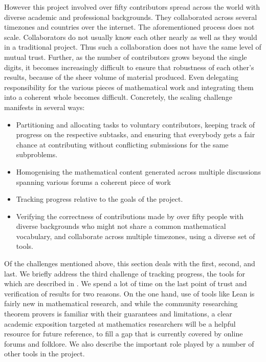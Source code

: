 However this project involved over fifty contributors spread across the world with diverse academic and professional backgrounds. They collaborated across several timezones and countries over the internet. The aforementioned process does not scale. Collaborators do not usually know each other nearly as well as they would in a traditional project. Thus such a collaboration does not have the same level of mutual trust. Further, as the number of contributors grows beyond the single digits, it becomes increasingly difficult to ensure that robustness of each other's results, because of the sheer volume of material produced. Even delegating responsibility for the various pieces of mathematical work and integrating them into a coherent whole becomes difficult. Concretely, the scaling challenge manifests in several ways:
\begin{itemize}
    \item Partitioning and allocating tasks to voluntary contributors, keeping track of progress on the respective subtasks, and ensuring that everybody gets a fair chance at contributing without conflicting submissions for the same subproblems.
    \item Homogenising the mathematical content generated across multiple discussions spanning various forums a coherent piece of work
    \item Tracking progress relative to the goals of the project.
    \item Verifying the correctness of contributions made by over fifty people with diverse backgrounds who might not share a common mathematical vocabulary, and collaborate across multiple timezones, using a diverse set of tools.
\end{itemize}

Of the challenges mentioned above, this section deals with the first, second, and last. We briefly address the third challenge of tracking progress, the tools for which are described in . We spend a lot of time on the last point of trust and verification of results for two reasons. On the one hand, use of tools like Lean is fairly new in mathematical research, and while the community researching theorem provers is familiar with their guarantees and limitations, a clear academic exposition targeted at mathematics researchers will be a helpful resource for future reference, to fill a gap that is currently covered by online forums and folklore. We also describe the important role played by a number of other tools in the project.

